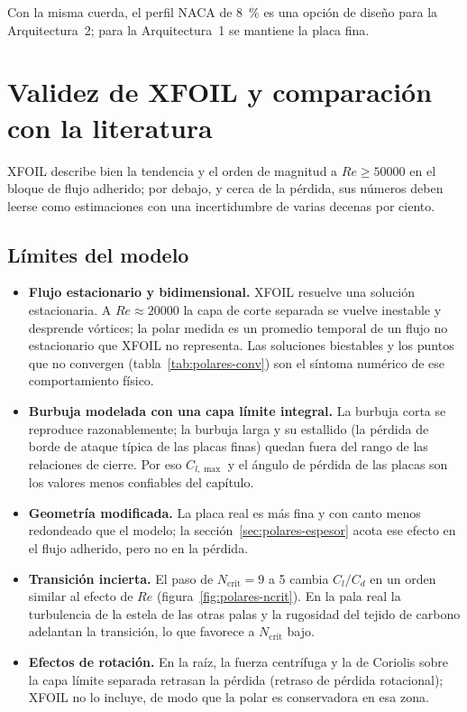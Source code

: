 Con la misma cuerda, el perfil NACA de \SI{8}{\percent} es una opción de diseño para la Arquitectura~2; para la Arquitectura~1 se mantiene la placa fina.

\section{Validez de XFOIL y comparación con la literatura}\label{sec:polares-validez}

XFOIL describe bien la tendencia y el orden de magnitud a $Re\ge\num{50000}$ en el bloque
de flujo adherido; por debajo, y cerca de la pérdida, sus números deben leerse como
estimaciones con una incertidumbre de varias decenas por ciento.

\subsection{Límites del modelo}
\begin{itemize}
  \item \textbf{Flujo estacionario y bidimensional.} XFOIL resuelve una solución
        estacionaria. A $Re\approx\num{20000}$ la capa de corte separada se vuelve
        inestable y desprende vórtices; la polar medida es un promedio temporal de un flujo
        no estacionario que XFOIL no representa. Las soluciones biestables y los puntos que
        no convergen (tabla~\ref{tab:polares-conv}) son el síntoma numérico de ese
        comportamiento físico.
  \item \textbf{Burbuja modelada con una capa límite integral.} La burbuja corta se
        reproduce razonablemente; la burbuja larga y su estallido (la pérdida de borde de
        ataque típica de las placas finas) quedan fuera del rango de las relaciones de
        cierre. Por eso $C_{l,\max}$ y el ángulo de pérdida de las placas son los valores
        menos confiables del capítulo.
  \item \textbf{Geometría modificada.} La placa real es más fina y con canto menos
        redondeado que el modelo; la sección~\ref{sec:polares-espesor} acota ese efecto
        en el flujo adherido, pero no en la pérdida.
  \item \textbf{Transición incierta.} El paso de $N_{\text{crit}}=9$ a 5 cambia $C_l/C_d$
        en un orden similar al efecto de $Re$ (figura~\ref{fig:polares-ncrit}). En la pala
        real la turbulencia de la estela de las otras palas y la rugosidad del tejido de
        carbono adelantan la transición, lo que favorece a $N_{\text{crit}}$ bajo.
  \item \textbf{Efectos de rotación.} En la raíz, la fuerza centrífuga y la de Coriolis
        sobre la capa límite separada retrasan la pérdida (retraso de pérdida rotacional);
        XFOIL no lo incluye, de modo que la polar es conservadora en esa zona.
\end{itemize}

